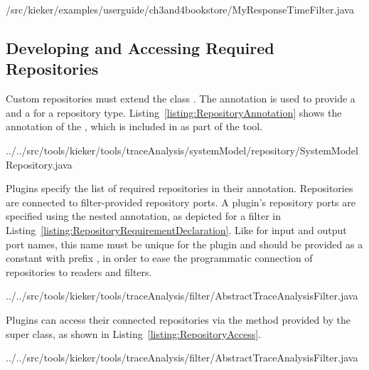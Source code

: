 
\setJavaCodeListing
%
{\customComponentsBookstoreApplicationDir/src/kieker/examples/userguide/ch3and4bookstore/MyResponseTimeFilter.java}

\subsection{Developing and Accessing Required Repositories}\label{sec:analysis:repositories}

Custom repositories must extend the class . %
The  annotation is used to provide a  %
and a  for a repository type. %
Listing~\ref{listing:RepositoryAnnotation} shows the  annotation %
of the , which is included in \Kieker{} as part of the %
\KiekerTraceAnalysis{} tool. %

\enlargethispage{1cm}

\setJavaCodeListing
%
{../../src/tools/kieker/tools/traceAnalysis/systemModel/repository/SystemModelRepository.java}

\noindent Plugins specify the list of required repositories in their %
 annotation. Repositories are connected to filter-provided %
repository ports. A plugin's repository ports are specified using the %
nested  annotation, as depicted for a %
\KiekerTraceAnalysis{} filter in Listing~\ref{listing:RepositoryRequirementDeclaration}. %
Like for input and output port names, this name must be unique for the plugin %
and should be provided as a  constant %
with prefix , in order to ease the programmatic %
connection of repositories to readers and filters. %

\setJavaCodeListing
%
{../../src/tools/kieker/tools/traceAnalysis/filter/AbstractTraceAnalysisFilter.java}

\noindent Plugins can access their connected repositories via the  %
method provided by the super class, as shown in Listing~\ref{listing:RepositoryAccess}. %

\setJavaCodeListing
%
{../../src/tools/kieker/tools/traceAnalysis/filter/AbstractTraceAnalysisFilter.java}

